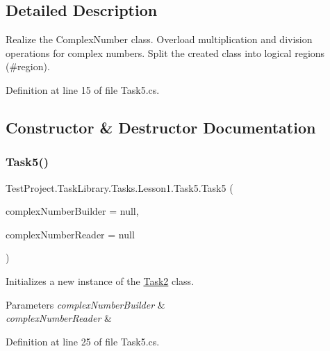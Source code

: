 \subsection{Detailed Description}
Realize the Complex\+Number class. Overload multiplication and division operations for complex numbers. Split the created class into logical regions (\#region). 



Definition at line 15 of file Task5.\+cs.



\subsection{Constructor \& Destructor Documentation}
\mbox{\label{class_test_project_1_1_task_library_1_1_tasks_1_1_lesson1_1_1_task5_a972486a187db262632d1573616a39c4c}} 
\subsubsection{\texorpdfstring{Task5()}{Task5()}}
{\footnotesize\ttfamily Test\+Project.\+Task\+Library.\+Tasks.\+Lesson1.\+Task5.\+Task5 (\begin{DoxyParamCaption}\item[{I\+Builder$<$ \mbox{\hyperlink{class_test_project_1_1_task_library_1_1_tasks_1_1_lesson1_1_1_models_1_1_complex_number}{Complex\+Number}} $>$}]{complex\+Number\+Builder = {\ttfamily null},  }\item[{I\+Reader}]{complex\+Number\+Reader = {\ttfamily null} }\end{DoxyParamCaption})}



Initializes a new instance of the \mbox{\hyperlink{class_test_project_1_1_task_library_1_1_tasks_1_1_lesson1_1_1_task2}{Task2}} class. 


\begin{DoxyParams}{Parameters}
{\em complex\+Number\+Builder} & \\
\hline
{\em complex\+Number\+Reader} & \\
\hline
\end{DoxyParams}


Definition at line 25 of file Task5.\+cs.



